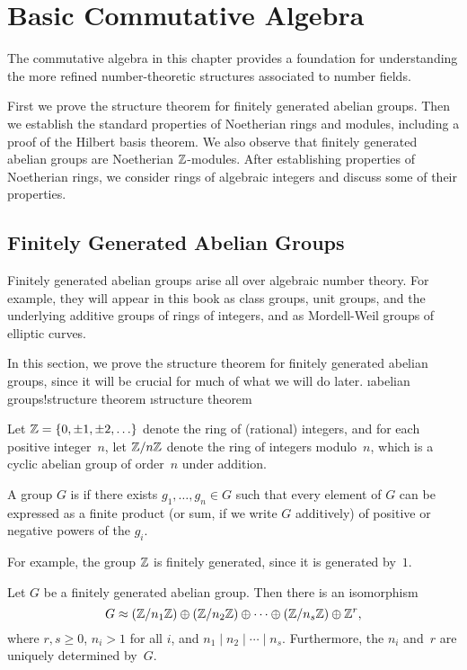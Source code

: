 \chapter{Basic Commutative Algebra}

The commutative algebra in this chapter provides a
foundation for understanding the more refined number-theoretic
structures associated to number fields.

First we prove the structure theorem for finitely generated abelian
groups.  Then we establish the standard properties of Noetherian rings
and modules, including a proof of the Hilbert basis theorem.  We also
observe that finitely generated abelian groups are Noetherian
$\mathbb{Z}$-modules.  After establishing
properties of Noetherian rings, we consider rings of algebraic
integers and discuss some of their properties.

\section{Finitely Generated Abelian Groups}\label{sec:fg}
Finitely generated abelian groups arise all over algebraic number
theory.  For example, they will appear in this book as class groups,
unit groups, and the underlying additive groups of rings of integers,
and as Mordell-Weil groups of elliptic curves.

In this section, we prove the structure theorem for finitely generated
abelian groups, since it will be crucial for much of what we will do
later. \i{abelian groups!structure theorem} \i{structure theorem}

Let $\mathbb{Z}=\{0,\pm 1, \pm 2, \ldots\}$ denote the ring of (rational)
integers, and for each positive integer~$n$, let $\mathbb{Z}/n\mathbb{Z}$ denote the
ring of integers modulo~$n$, which is a cyclic abelian group of
order~$n$ under addition.

\begin{definition}
	A group $G$ is  if there exists
	$g_1,\ldots, g_n \in G$ such that every element of $G$ can be
	expressed as a finite product (or sum, if we write $G$ additively)
	of positive or negative powers of the $g_i$.
\end{definition}
For example, the group $\mathbb{Z}$ is finitely generated, since it is generated
by~$1$.

\begin{theorem}
	\label{thm:struc}
	Let $G$ be a finitely generated abelian group. Then there is an isomorphism
	$$
		G \approx (\mathbb{Z}/n_1\mathbb{Z}) \oplus (\mathbb{Z}/n_2\mathbb{Z}) \oplus
		\cdots \oplus (\mathbb{Z}/n_s\mathbb{Z}) \oplus \mathbb{Z}^{r},
	$$
	where $r, s\geq 0$, $n_i>1$ for all $i$, and $n_1\mid{}n_2\mid{}\cdots \mid{}n_s$.
	Furthermore, the $n_i$ and~$r$ are uniquely determined by~$G$.
\end{theorem}

